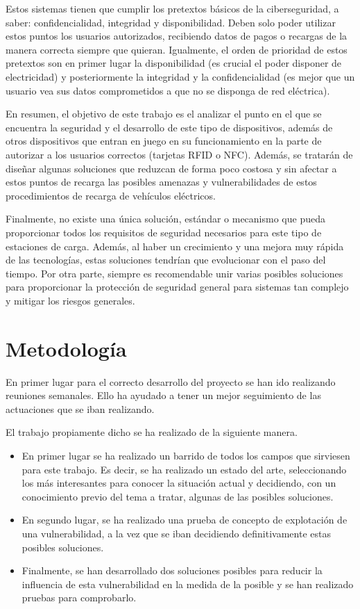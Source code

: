 \documentclass[12pt,a4paper,onecolumn,oneside]{report}
\begin{document}
Estos sistemas tienen que cumplir los pretextos básicos de la ciberseguridad, a saber: confidencialidad, integridad y disponibilidad. Deben solo poder utilizar estos puntos los usuarios autorizados, recibiendo datos de pagos o recargas de la manera correcta siempre que quieran. Igualmente, el orden de prioridad de estos pretextos son en primer lugar la disponibilidad (es crucial el poder disponer de electricidad) y posteriormente la integridad y la confidencialidad (es mejor que un usuario vea sus datos comprometidos a que no se disponga de red eléctrica).

En resumen, el objetivo de este trabajo es el analizar el punto en el que se encuentra la seguridad y el desarrollo de este tipo de dispositivos, además de otros dispositivos que entran en juego en su funcionamiento en la parte de autorizar a los usuarios correctos (tarjetas RFID o NFC). Además, se tratarán de diseñar algunas soluciones que reduzcan de forma poco costosa y sin afectar a estos puntos de recarga las posibles amenazas y vulnerabilidades de estos procedimientos de recarga de vehículos eléctricos.

Finalmente, no existe una única solución, estándar o mecanismo que pueda proporcionar todos los requisitos de seguridad necesarios para este tipo de estaciones de carga. Además, al haber un crecimiento y una mejora muy rápida de las tecnologías, estas soluciones tendrían que evolucionar con el paso del tiempo. Por otra parte, siempre es recomendable unir varias posibles soluciones para proporcionar la protección de seguridad general para sistemas tan complejo y mitigar los riesgos generales.



\section*{Metodología}

En primer lugar para el correcto desarrollo del proyecto se han ido realizando reuniones semanales. Ello ha ayudado a tener un mejor seguimiento de las actuaciones que se iban realizando.

El trabajo propiamente dicho se ha realizado de la siguiente manera.
\begin{itemize}
\item En primer lugar se ha realizado un barrido de todos los campos que sirviesen para este trabajo. Es decir, se ha realizado un estado del arte, seleccionando los más interesantes para conocer la situación actual y decidiendo, con un conocimiento previo del tema a tratar, algunas de las posibles soluciones.
\item En segundo lugar, se ha realizado una prueba de concepto de explotación de una vulnerabilidad, a la vez que se iban decidiendo definitivamente estas posibles soluciones.
\item Finalmente, se han desarrollado dos soluciones posibles para reducir la influencia de esta vulnerabilidad en la medida de la posible y se han realizado pruebas para comprobarlo.
\end{itemize}
\end{document}

